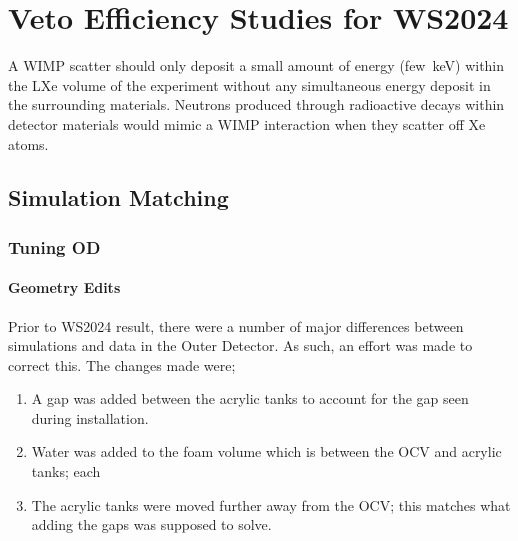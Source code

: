 \chapter{Veto Efficiency Studies for WS2024}
A WIMP scatter should only deposit a small amount of energy (few~keV) within the LXe volume of the experiment without any simultaneous energy deposit in the surrounding materials. Neutrons produced through radioactive decays within detector materials would mimic a WIMP interaction when they scatter off Xe atoms. 

\section{Simulation Matching}\label{sec:simulation_improvements}
\subsection{Tuning OD}
\subsubsection{Geometry Edits}\label{sec:GeometryEdits}
Prior to WS2024 result, there were a number of major differences between simulations and data in the Outer Detector. 
As such, an effort was made to correct this. 
The changes made were;
\begin{enumerate}
    \item A gap was added between the acrylic tanks to account for the gap seen during installation.
    \item Water was added to the foam volume which is between the OCV and acrylic tanks; each 
    \item The acrylic tanks were moved further away from the OCV; this matches what adding the gaps was supposed to solve.
\end{enumerate}

